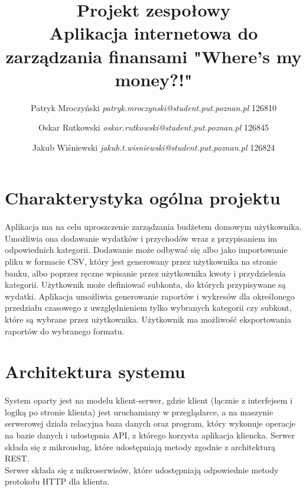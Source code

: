 \documentclass{article}
\title{\Huge{
		\indexspace Projekt zespołowy \\[1cm] 
		\indexspace Aplikacja internetowa do zarządzania finansami 
		\indexspace \textbf{"Where's my money?!"}}}
\author{Patryk Mroczyński \textlangle{}\textit{patryk.mroczynski@student.put.poznan.pl}\textrangle{} 126810
   \and Oskar Rutkowski \textlangle{}\textit{oskar.rutkowski@student.put.poznan.pl}\textrangle{} 126845 
   \and Jakub Wiśniewski \textlangle{}\textit{jakub.t.wisniewski@student.put.poznan.pl}\textrangle{} 126824}
\begin{document}
	
	\maketitle
	\newpage
	\tableofcontents
	\newpage
	
	\section{Charakterystyka ogólna projektu}
	\paragraph{} Aplikacja ma na celu uproszczenie zarządzania budżetem domowym użytkownika. Umożliwia ona dodawanie wydatków i przychodów wraz z przypisaniem im odpowiednich kategorii. Dodawanie może odbywać się albo jako importowanie pliku w formacie CSV, który jest generowany przez użytkownika na stronie banku, albo poprzez ręczne wpisanie przez użytkownika kwoty i przydzielenia kategorii. Użytkownik może definiować subkonta, do których przypisywane są wydatki. Aplikacja umożliwia generowanie raportów i wykresów dla określonego przedziału czasowego z uwzględnieniem tylko wybranych kategorii czy subkont, które są wybrane przez użytkownika. Użytkownik ma możliwość eksportowania raportów do wybranego formatu.
	\section{Architektura systemu}
	\paragraph{} System oparty jest na modelu klient-serwer, gdzie klient (łącznie z interfejsem i logiką po stronie klienta) jest uruchamiany w przeglądarce, a na maszynie serwerowej działa relacyjna baza danych oraz program, który wykonuje operacje na bazie danych i udostępnia API, z którego korzysta aplikacja kliencka. Serwer składa się z mikrousług, które udostępniają metody zgodnie z architekturą REST. \\[0.5cm]
	Serwer składa się z mikroserwisów, które udostępniają odpowiednie metody protokołu HTTP dla klienta.
	
\end{document}
